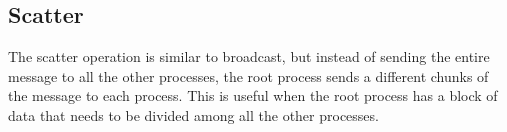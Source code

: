     

\subsection{Scatter}
    The scatter operation is similar to broadcast, but instead of sending
    the entire message to all the other processes, the root process
    sends a different chunks of the message to each process. This is useful
    when the root process has a block of data that needs to be divided
    among all the other processes.



